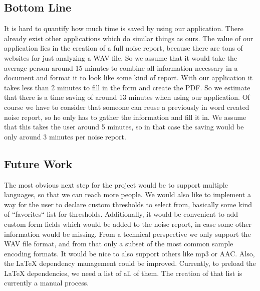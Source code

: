 \subsection{Bottom Line}
It is hard to quantify how much time is saved by using our application. There already exist other applications which do similar things as ours.
The value of our application lies in the creation of a full noise report, because there are tons of websites for just analyzing a WAV file.
So we assume that it would take the average person around 15 minutes to combine all information necessary in a document and format it to look like some kind of report.
With our application it takes less than 2 minutes to fill in the form and create the PDF. So we estimate that there is a time saving of around 13 minutes when using our application. Of course we have to consider that someone can reuse a previously in word created noise report, so he only has to gather the information and fill it in. We assume that this takes the user around 5 minutes, so in that case the saving would be only around 3 minutes per noise report.

\subsection{Future Work}
The most obvious next step for the project would be to support multiple languages, so that we can reach more people. We would also like to implement a way
for the user to declare custom thresholds to select from, basically some kind of ``favorites`` list for thresholds. Additionally, it would be convenient to add
custom form fields which would be added to the noise report, in case some other information would be missing. From a technical perspective we only support the WAV
file format, and from that only a subset of the most common sample encoding formats. It would be nice to also support others like mp3 or AAC. Also, the LaTeX dependency
management could be improved. Currently, to preload the LaTeX dependencies, we need a list of all of them. The creation of that list is currently a manual process.